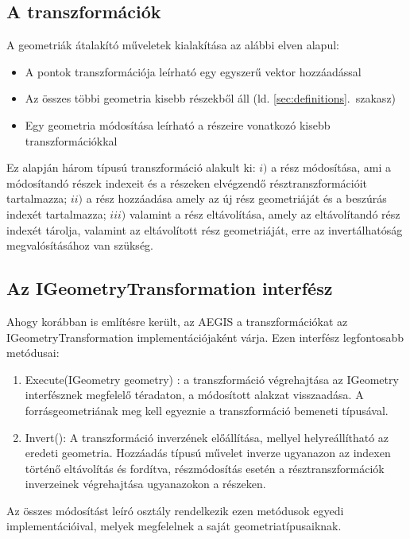 \subsection{A transzformációk}
A geometriák átalakító műveletek kialakítása az alábbi elven alapul:
\begin{itemize}
	\item A pontok transzformációja leírható egy egyszerű vektor hozzáadással
	\item Az összes többi geometria kisebb részekből áll (ld. \ref{sec:definitions}.~szakasz)
	\item Egy geometria módosítása leírható a részeire vonatkozó kisebb transzformációkkal
\end{itemize}
Ez alapján három típusú transzformáció alakult ki: $i)$ a rész módosítása, ami a módosítandó részek indexeit és a részeken elvégzendő résztranszformációit tartalmazza; $ii)$ a rész hozzáadása amely az új rész geometriáját és a beszúrás indexét tartalmazza; $iii)$ valamint a rész eltávolítása, amely az eltávolítandó rész indexét tárolja, valamint az eltávolított rész geometriáját, erre az invertálhatóság megvalósításához van szükség.
\subsection{Az IGeometryTransformation interfész}
Ahogy korábban is említésre került, az AEGIS a transzformációkat az IGeometryTransformation implementációjaként várja. Ezen interfész legfontosabb metódusai:
\begin{enumerate}
	\item Execute(IGeometry geometry) : a transzformáció végrehajtása az IGeometry interfésznek megfelelő téradaton, a módosított alakzat visszaadása. A forrásgeometriának meg kell egyeznie a transzformáció bemeneti típusával.
	\item Invert(): A transzformáció inverzének előállítása, mellyel helyreállítható az eredeti geometria. Hozzáadás típusú művelet inverze ugyanazon az indexen történő eltávolítás és fordítva, részmódosítás esetén a résztranszformációk inverzeinek végrehajtása ugyanazokon a részeken.
\end{enumerate}
Az összes módosítást leíró osztály rendelkezik ezen metódusok egyedi implementációival, melyek megfelelnek a saját geometriatípusaiknak.

